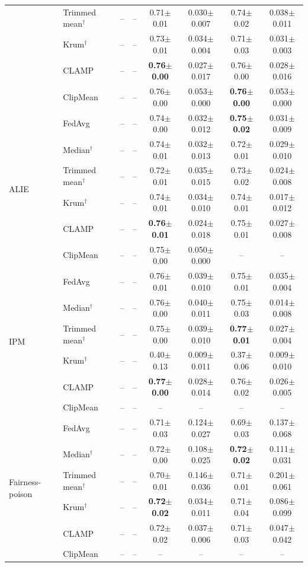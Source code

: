 \begin{table}[tbp]
\begin{tabular}{llcccccc}
 & Trimmed mean$^\dagger$ & -- & -- & 0.71$\pm$0.01 & 0.030$\pm$0.007 & 0.74$\pm$0.02 & 0.038$\pm$0.011 \\
 & Krum$^\dagger$ & -- & -- & 0.73$\pm$0.01 & 0.034$\pm$0.004 & 0.71$\pm$0.03 & 0.031$\pm$0.003 \\
 & CLAMP & -- & -- & \textbf{0.76$\pm$0.00} & 0.027$\pm$0.017 & 0.76$\pm$0.00 & 0.028$\pm$0.016 \\
 & ClipMean & -- & -- & 0.76$\pm$0.00 & 0.053$\pm$0.000 & \textbf{0.76$\pm$0.00} & 0.053$\pm$0.000 \\
\midrule
\multirow{6}{*}{ALIE} & FedAvg & -- & -- & 0.74$\pm$0.00 & 0.032$\pm$0.012 & \textbf{0.75$\pm$0.02} & 0.031$\pm$0.009 \\
 & Median$^\dagger$ & -- & -- & 0.74$\pm$0.01 & 0.032$\pm$0.013 & 0.72$\pm$0.01 & 0.029$\pm$0.010 \\
 & Trimmed mean$^\dagger$ & -- & -- & 0.72$\pm$0.01 & 0.035$\pm$0.015 & 0.73$\pm$0.02 & 0.024$\pm$0.008 \\
 & Krum$^\dagger$ & -- & -- & 0.74$\pm$0.01 & 0.034$\pm$0.010 & 0.74$\pm$0.01 & 0.017$\pm$0.012 \\
 & CLAMP & -- & -- & \textbf{0.76$\pm$0.01} & 0.024$\pm$0.018 & 0.75$\pm$0.01 & 0.027$\pm$0.008 \\
 & ClipMean & -- & -- & 0.75$\pm$0.00 & 0.050$\pm$0.000 & -- & -- \\
\midrule
\multirow{6}{*}{IPM} & FedAvg & -- & -- & 0.76$\pm$0.01 & 0.039$\pm$0.010 & 0.75$\pm$0.01 & 0.035$\pm$0.004 \\
 & Median$^\dagger$ & -- & -- & 0.76$\pm$0.00 & 0.040$\pm$0.011 & 0.75$\pm$0.03 & 0.014$\pm$0.008 \\
 & Trimmed mean$^\dagger$ & -- & -- & 0.75$\pm$0.00 & 0.039$\pm$0.010 & \textbf{0.77$\pm$0.01} & 0.027$\pm$0.004 \\
 & Krum$^\dagger$ & -- & -- & 0.40$\pm$0.13 & 0.009$\pm$0.011 & 0.37$\pm$0.06 & 0.009$\pm$0.010 \\
 & CLAMP & -- & -- & \textbf{0.77$\pm$0.00} & 0.028$\pm$0.014 & 0.76$\pm$0.02 & 0.026$\pm$0.005 \\
 & ClipMean & -- & -- & -- & -- & -- & -- \\
\midrule
\multirow{6}{*}{Fairness-poison} & FedAvg & -- & -- & 0.71$\pm$0.03 & 0.124$\pm$0.027 & 0.69$\pm$0.03 & 0.137$\pm$0.068 \\
 & Median$^\dagger$ & -- & -- & 0.72$\pm$0.00 & 0.108$\pm$0.025 & \textbf{0.72$\pm$0.02} & 0.111$\pm$0.031 \\
 & Trimmed mean$^\dagger$ & -- & -- & 0.70$\pm$0.01 & 0.146$\pm$0.036 & 0.71$\pm$0.01 & 0.201$\pm$0.061 \\
 & Krum$^\dagger$ & -- & -- & \textbf{0.72$\pm$0.02} & 0.034$\pm$0.011 & 0.71$\pm$0.04 & 0.086$\pm$0.099 \\
 & CLAMP & -- & -- & 0.72$\pm$0.02 & 0.037$\pm$0.006 & 0.71$\pm$0.03 & 0.047$\pm$0.042 \\
 & ClipMean & -- & -- & -- & -- & -- & -- \\
\bottomrule
\end{tabular}
\end{table}
